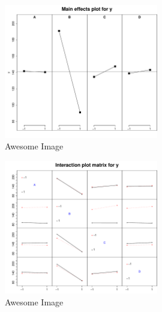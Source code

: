 \begin{figure}[p]
    \centering
    \includegraphics[width=0.6\textwidth]{PDF/mainEffects4factors.pdf}
    \caption{Awesome Image}
    \label{fig:awesome_image}
\end{figure}

\begin{figure}[p]
    \centering
    \includegraphics[width=0.6\textwidth]{PDF/interactionPlot4factors.pdf}
    \caption{Awesome Image}
    \label{fig:awesome_image}
\end{figure}
